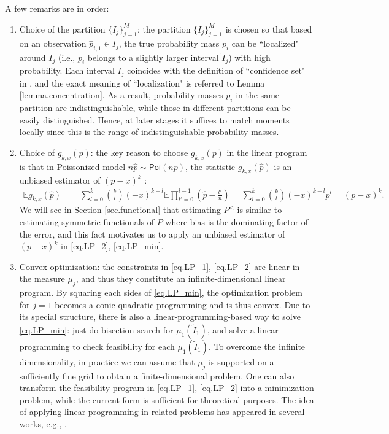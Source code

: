 \documentclass[final,12pt]{colt2018} %
\def \bE {\mathbb{E}}
\def \spo {\mathsf{Poi}}
\begin{document}
A few remarks are in order:
\begin{enumerate}
	\item Choice of the partition $\{I_j\}_{j=1}^M$: the partition $\{I_j\}_{j=1}^M$ is chosen so that based on an observation $\hat{p}_{i,1}\in I_j$, the true probability mass $p_i$ can be ``localized" around $I_j$ (i.e., $p_i$ belongs to a slightly larger interval $\tilde{I}_j$) with high probability. Each interval $I_j$ coincides with the definition of ``confidence set" in \cite{Han--Jiao--Weissman2016minimaxdivergence}, and the exact meaning of ``localization" is referred to Lemma \ref{lemma.concentration}. As a result, probability masses $p_i$ in the same partition are indistinguishable, while those in different partitions can be easily distinguished. Hence, at later stages it suffices to match moments locally since this is the range of indistinguishable probability masses.
	\item Choice of $g_{k,x}(p)$: the key reason to choose $g_{k,x}(p)$ in the linear program is that in Poissonized model $n\hat{p}\sim \spo(np)$, the statistic $g_{k,x}(\hat{p})$ is an unbiased estimator of $(p-x)^k$ \cite[Example 2.8]{Withers1987}:
	\begin{align}\label{eq.unbiased}
	\bE g_{k,x}(\hat{p}) &= \sum_{l=0}^k \binom{k}{l}(-x)^{k-l}\bE\prod_{l'=0}^{l-1}\left(\hat{p}-\frac{l'}{n}\right) = \sum_{l=0}^k \binom{k}{l}(-x)^{k-l}p^l = (p-x)^k.
	\end{align}
	We will see in Section \ref{sec.functional} that estimating $P^<$ is similar to estimating symmetric functionals of $P$ where bias is the dominating factor of the error, and this fact motivates us to apply an unbiased estimator of $(p-x)^k$ in \eqref{eq.LP_2}, \eqref{eq.LP_min}.
	\item Convex optimization: the constraints in \eqref{eq.LP_1}, \eqref{eq.LP_2} are linear in the measure $\mu_j$, and thus they constitute an infinite-dimensional linear program. By squaring each sides of \eqref{eq.LP_min}, the optimization problem for $j=1$ becomes a conic quadratic programming and is thus convex. Due to its special structure, there is also a linear-programming-based way to solve \eqref{eq.LP_min}: just do bisection search for $\mu_1(\tilde{I}_1)$, and solve a linear programming to check feasibility for each $\mu_1(\tilde{I}_1)$. To overcome the infinite dimensionality, in practice we can assume that $\mu_j$ is supported on a sufficiently fine grid to obtain a finite-dimensional problem. One can also transform the feasibility program in \eqref{eq.LP_1}, \eqref{eq.LP_2} into a minimization problem, while the current form is sufficient for theoretical purposes. The idea of applying linear programming in related problems has appeared in several works, e.g., \cite{Valiant--Valiant2011,Valiant--Valiant2013estimating,valiant2015instance,kong2017spectrum,tian2017learning}.

\end{enumerate}
\end{document}
